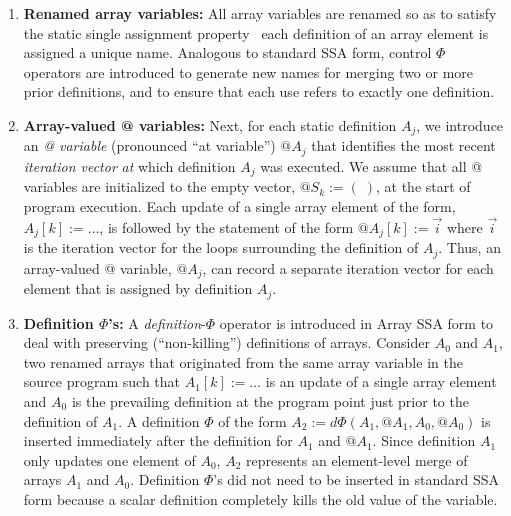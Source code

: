 \begin{enumerate}
\item {\bf Renamed array variables:}
All array variables are renamed so as to 
satisfy the static single assignment property \ie\ each
definition of an array element is assigned a unique name.  Analogous to standard SSA
form, control $\Phi$ operators are introduced to generate new names
for merging two or more prior definitions, and to ensure that each use
refers to exactly one definition.

\item {\bf Array-valued @ variables:}
Next, for each static definition
$A_j$, we introduce an {\em @ variable} (pronounced ``at variable'')
$@A_j$ that identifies
the most recent {\em iteration vector} {\it
at} which definition $A_j$ was executed.
We assume that all @ variables are initialized to the empty
vector, $@S_k := (\;)$, at the start of program execution.  
Each update of a single array element of the form, $A_j[k] := \ldots$, 
is followed by the statement of the form $@A_j[k] := \vec{i}$
where $\vec{i}$ is the iteration vector for the loops surrounding
the definition of $A_j$.
Thus, an array-valued @ variable, $@A_j$,  
can record a separate iteration vector for
each element that is assigned by definition $A_j$.


\item {\bf Definition $\Phi$'s:}
\label{def:phi}
A  {\it definition}-$\Phi$ operator is 
introduced in Array SSA form to deal with preserving (``non-killing'') definitions
of arrays.  Consider $A_0$ and $A_1$, two renamed 
arrays that originated from the same array variable in the source program
such that $A_1[k] := \ldots$
is an update of a single array element
and $A_0$ is the prevailing definition at the program point just
prior to the definition of $A_1$.
A definition $\Phi$ of the form $A_2 := d\Phi(A_1, @A_1, A_0, @A_0)$ 
is inserted immediately after the definition for $A_1$ and $@A_1$.
Since definition $A_1$ only updates one element of $A_0$, $A_2$ represents
an element-level merge of arrays $A_1$ and $A_0$.
Definition $\Phi$'s did not need to be
inserted in standard SSA form because a scalar definition completely kills the old value of
the variable.  



\end{enumerate}
